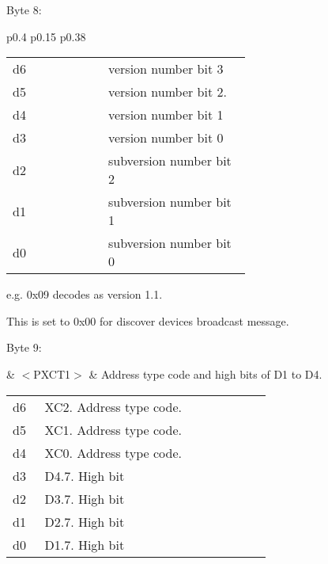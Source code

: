 Byte 8:

\begin{tabular}{p{0.4\linewidth} p{0.15\linewidth} p{0.38\linewidth}} 

\begin{tabular}{|p{0.3cm}|p{0.3cm}|p{0.3cm}|p{0.3cm}|p{0.3cm}|p{0.3cm}|p{0.3cm}|p{0.3cm}|}
\hline
0 & d6 & d5 & d4 & d3 & d2 & d1 & d0\\
\hline
\end{tabular}
&  & Software Version Number.\\
\end{tabular}

\begin{tabular}{p{0.05\linewidth} p{0.6\linewidth}} 
d6 & version number bit 3\\
d5 & version number bit 2.\\
d4 & version number bit 1\\
d3 & version number bit 0\\
d2 & subversion number bit 2\\
d1 & subversion number bit 1\\
d0 & subversion number bit 0\\
\end{tabular}

e.g. 0x09 decodes as version 1.1.

This is set to 0x00 for discover devices broadcast message.

Byte 9:

& $<$PXCT1$>$ & Address type code and high bits of D1 to D4.\\
\end{tabular}

\begin{tabular}{p{0.05\linewidth} p{0.6\linewidth}} 
d6 & XC2. Address type code.\\
d5 & XC1. Address type code.\\
d4 & XC0. Address type code.\\
d3 & D4.7. High bit\\
d2 & D3.7. High bit\\
d1 & D2.7. High bit\\
d0 & D1.7. High bit\\
\end{tabular}


